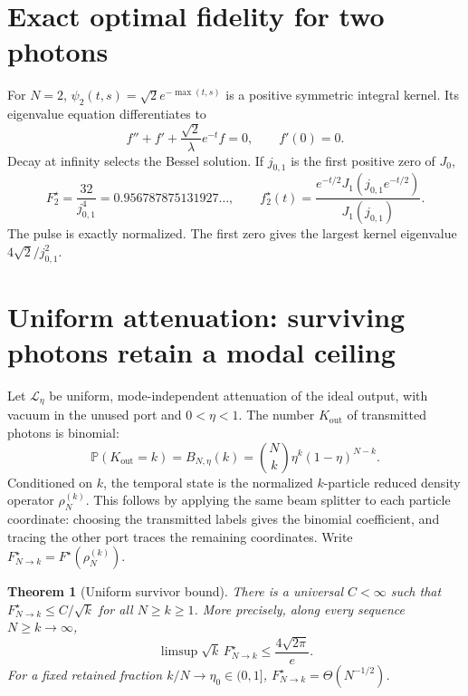 \documentclass[11pt,a4paper]{article}
\newtheorem{theorem}{Theorem}
\newcommand{\Prob}{\mathbb P}
\begin{document}
\section{Exact optimal fidelity for two photons}
\label{sec:two}
For $N=2$, $\psi_2(t,s)=\sqrt2e^{-\max(t,s)}$ is a positive symmetric integral kernel. Its eigenvalue equation differentiates to
\begin{equation}f''+f'+\frac{\sqrt2}{\lambda}e^{-t}f=0,\qquad f'(0)=0.\end{equation}
Decay at infinity selects the Bessel solution. If $j_{0,1}$ is the first positive zero of $J_0$,
\begin{equation}\boxed{
 F_2^\star=\frac{32}{j_{0,1}^4}=0.956787875131927\ldots,\qquad
 f_2^\star(t)=\frac{e^{-t/2}J_1(j_{0,1}e^{-t/2})}{J_1(j_{0,1})}.}
\end{equation}
The pulse is exactly normalized. The first zero gives the largest kernel eigenvalue $4\sqrt2/j_{0,1}^2$.

\section{Uniform attenuation: surviving photons retain a modal ceiling}
\label{sec:attenuation}

Let \(\mathcal L_\eta\) be uniform, mode-independent attenuation of the
ideal output, with vacuum in the unused port and \(0<\eta<1\).
The number \(K_{\mathrm{out}}\) of transmitted photons is binomial:
\begin{equation}
 \Prob(K_{\mathrm{out}}=k)=B_{N,\eta}(k)
 =\binom Nk\eta^k(1-\eta)^{N-k}.
 \label{eq:binomialloss}
\end{equation}
Conditioned on \(k\), the temporal state is the normalized
\(k\)-particle reduced density operator \(\rho_N^{(k)}\). This follows
by applying the same beam splitter to each particle coordinate:
choosing the transmitted labels gives the binomial coefficient, and
tracing the other port traces the remaining coordinates. Write
\(F_{N\to k}^\star=F^\star(\rho_N^{(k)})\).

\begin{theorem}[Uniform survivor bound]
There is a universal \(C<\infty\) such that
\(F_{N\to k}^\star\le C/\sqrt{k}\) for all \(N\ge k\ge1\).
More precisely, along every sequence \(N\ge k\to\infty\),
\begin{equation}
 \limsup \sqrt{k}\,F_{N\to k}^\star
 \le\frac{4\sqrt{2\pi}}e.
 \label{eq:survivor}
\end{equation}
For a fixed retained fraction \(k/N\to\eta_0\in(0,1]\),
\(F_{N\to k}^\star=\Theta(N^{-1/2})\).
\end{theorem}
\end{document}
